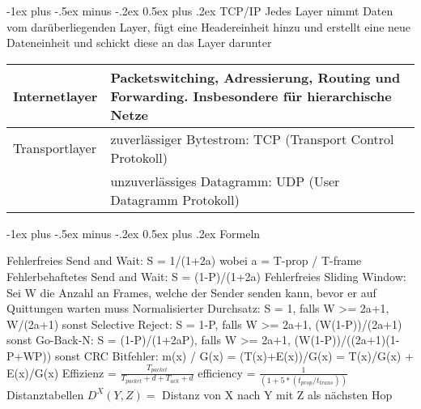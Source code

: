 \documentclass[10pt,landscape]{article}
\makeatletter
\renewcommand{\section}{\@startsection{section}{1}{0mm}%
                                {-1ex plus -.5ex minus -.2ex}%
                                {0.5ex plus .2ex}%
                                {\normalfont\large\bfseries}}
\makeatother
\begin{document}
\section{TCP/IP}
Jedes Layer nimmt Daten vom darüberliegenden Layer, fügt eine Headereinheit hinzu und erstellt eine neue Dateneinheit und schickt diese an das Layer darunter
\begin{tabular}{l | l}
    Internetlayer & Packetswitching, Adressierung, Routing und Forwarding. Insbesondere für hierarchische Netze \\
    \hline
    Transportlayer & zuverlässiger Bytestrom: TCP (Transport Control Protokoll) \\
        & unzuverlässiges Datagramm: UDP (User Datagramm Protokoll)\\
\end{tabular}


\section{Formeln}

Fehlerfreies Send and Wait: S = 1/(1+2a) wobei a = T-prop / T-frame
Fehlerbehaftetes Send and Wait: S = (1-P)/(1+2a)
Fehlerfreies Sliding Window: Sei W die Anzahl an Frames, welche der Sender senden kann, bevor er auf Quittungen warten muss
Normalisierter Durchsatz: S = {1, falls W >= 2a+1, W/(2a+1) sonst}
Selective Reject: S = {1-P, falls W >= 2a+1, (W(1-P))/(2a+1) sonst}
Go-Back-N: S = {(1-P)/(1+2aP), falls W >= 2a+1, (W(1-P))/((2a+1)(1-P+WP)) sonst}
CRC Bitfehler: m(x) / G(x) = (T(x)+E(x))/G(x) = T(x)/G(x) + E(x)/G(x)
Effizienz = $\frac{T_{packet} }{ T_{packet} + d + T_{ack} + d}$
efficiency = $\frac{1}{ (1+5 * (t_{prop}/t_{trans}))}$
Distanztabellen $D^X(Y,Z) =$ Distanz von X nach Y mit Z als nächsten Hop
\end{document}
